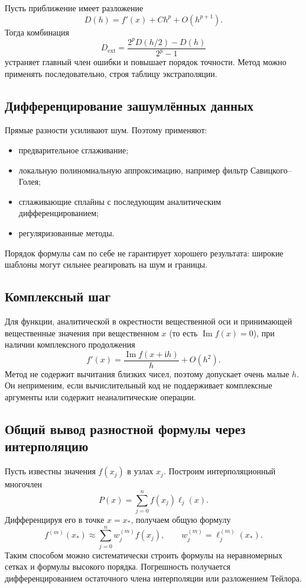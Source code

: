 Пусть приближение имеет разложение
\[
    D(h)=f'(x)+Ch^p+O(h^{p+1}).
\]
Тогда комбинация
\[
    D_{\mathrm{ext}}=
    \frac{2^pD(h/2)-D(h)}{2^p-1}
\]
устраняет главный член ошибки и повышает порядок точности. Метод можно применять
последовательно, строя таблицу экстраполяции.

\subsection{Дифференцирование зашумлённых данных}

Прямые разности усиливают шум. Поэтому применяют:
\begin{itemize}
    \item предварительное сглаживание;
    \item локальную полиномиальную аппроксимацию, например фильтр
          Савицкого--Голея;
    \item сглаживающие сплайны с последующим аналитическим дифференцированием;
    \item регуляризованные методы.
\end{itemize}
Порядок формулы сам по себе не гарантирует хорошего результата: широкие шаблоны
могут сильнее реагировать на шум и границы.

\subsection{Комплексный шаг}

Для функции, аналитической в окрестности вещественной оси и принимающей
вещественные значения при вещественном $x$ (то есть $\operatorname{Im}f(x)=0$),
при наличии комплексного продолжения
\[
    f'(x)=\frac{\operatorname{Im}f(x+\mathrm{i}h)}{h}+O(h^2).
\]
Метод не содержит вычитания близких чисел, поэтому допускает очень малые $h$.
Он неприменим, если вычислительный код не поддерживает комплексные аргументы или
содержит неаналитические операции.

\subsection{Общий вывод разностной формулы через интерполяцию}

Пусть известны значения $f(x_j)$ в узлах $x_j$. Построим интерполяционный многочлен
\[
    P(x)=\sum_{j=0}^{n}f(x_j)\ell_j(x).
\]
Дифференцируя его в точке $x=x_*$, получаем общую формулу
\[
    f^{(m)}(x_*)
    \approx
    \sum_{j=0}^{n} w_j^{(m)} f(x_j),
    \qquad
    w_j^{(m)}=\ell_j^{(m)}(x_*).
\]
Таким способом можно систематически строить формулы на неравномерных сетках и формулы
высокого порядка. Погрешность получается дифференцированием остаточного члена
интерполяции или разложением Тейлора.

